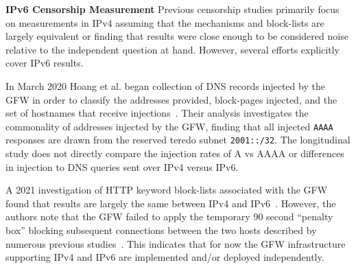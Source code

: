 \textbf{IPv6 Censorship Measurement}
Previous censorship studies primarily focus on measurements in IPv4
assuming that the mechanisms and block-lists are largely equivalent or finding
that results were close enough to be considered noise relative to the independent
question at hand. However, several efforts explicitly cover IPv6 results.

In March 2020 Hoang et al. began collection of DNS records injected by the GFW in order to
classify the addresses provided, block-pages injected, and the set of hostnames
that receive injections~\cite{USESEC21:GFWatch}. Their analysis investigates the
commonality of addresses injected by the GFW, finding that all injected
\texttt{AAAA} responses are drawn from the reserved teredo subnet \texttt{2001::/32}.
The longitudinal study does not directly compare the injection rates
of A vs AAAA or differences in injection to DNS queries sent over IPv4 versus IPv6.

A 2021 investigation of HTTP keyword block-lists associated with the GFW
found that results are largely the same between IPv4 and IPv6~\cite{weinberg2021chinese}.
However, the authors note that the GFW failed to apply the temporary 90 second ``penalty box''
blocking subsequent connections between the two hosts described by numerous
previous studies~\cite{xu2011internet,clayton2006ignoring}. This indicates that for now the GFW
infrastructure supporting IPv4 and IPv6 are implemented and/or deployed independently.

